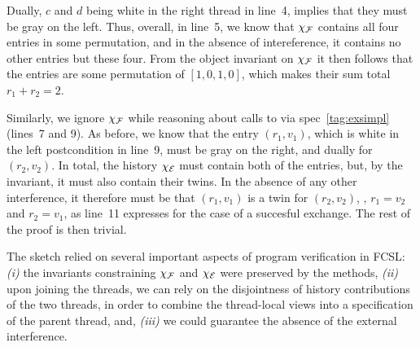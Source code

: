 Dually, $c$ and $d$ being white in the right thread in line~4, implies
that they must be gray on the left. Thus, overall, in line~5, we know
that $\chi_{\cal F}$ contains all four entries in some permutation,
and in the absence of intereference, it contains no other entries but
these four. From the object invariant on $\chi_{\cal F}$ it then
follows that the entries are some permutation of $[1,0,1,0]$, which
makes their sum total $r_1 + r_2 = 2$. 
%


Similarly, we ignore $\chi_{\cal F}$ while reasoning about calls to
 via spec~\eqref{tag:exsimpl} (lines~7 and 9). As
before, we know that the entry $(r_1, v_1)$, which is white in the
left postcondition in line~9, must be gray on the right, and dually
for $(r_2, v_2)$. In total, the history $\chi_{\cal E}$ must contain
both of the entries, but, by the invariant, it must also contain their
twins. In the absence of any other interference, it therefore must be
that $(r_1, v_1)$ is a twin for $(r_2, v_2)$, \ie, $r_1 = v_2$ and
$r_2 = v_1$, as line~11 expresses for the case of a succesful
exchange.
%
%
The rest of the proof is then trivial.

The sketch relied on several important aspects of program verification
in FCSL: \emph{(i)} the invariants constraining $\chi_{\cal F}$ and
$\chi_{\cal E}$ were preserved by the methods, \emph{(ii)} upon
joining the threads, we can rely on the disjointness of history
contributions of the two threads, in order to combine the thread-local
views into a specification of the parent thread, and, \emph{(iii)} we
could guarantee the absence of the external interference.

